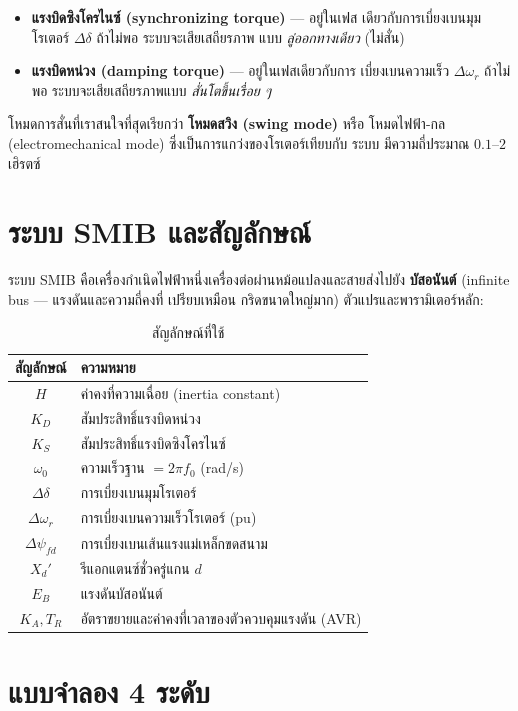 \documentclass[12pt,a4paper]{article}
\newcommand{\dwr}{\Delta\omega_r}
\newcommand{\ddel}{\Delta\delta}
\newcommand{\dpsifd}{\Delta\psi_{fd}}
\begin{document}
\begin{itemize}
  \item \textbf{แรงบิดซิงโครไนซ์ (synchronizing torque)} --- อยู่ในเฟส
        เดียวกับการเบี่ยงเบนมุมโรเตอร์ $\ddel$ ถ้าไม่พอ ระบบจะเสียเสถียรภาพ
        แบบ \emph{ลู่ออกทางเดียว} (ไม่สั่น)
  \item \textbf{แรงบิดหน่วง (damping torque)} --- อยู่ในเฟสเดียวกับการ
        เบี่ยงเบนความเร็ว $\dwr$ ถ้าไม่พอ ระบบจะเสียเสถียรภาพแบบ
        \emph{สั่นโตขึ้นเรื่อย ๆ}
\end{itemize}

โหมดการสั่นที่เราสนใจที่สุดเรียกว่า \textbf{โหมดสวิง (swing mode)} หรือ
โหมดไฟฟ้า-กล (electromechanical mode) ซึ่งเป็นการแกว่งของโรเตอร์เทียบกับ
ระบบ มีความถี่ประมาณ $0.1$--$2$ เฮิรตซ์

\section{ระบบ SMIB และสัญลักษณ์}

ระบบ SMIB คือเครื่องกำเนิดไฟฟ้าหนึ่งเครื่องต่อผ่านหม้อแปลงและสายส่งไปยัง
\textbf{บัสอนันต์} (infinite bus --- แรงดันและความถี่คงที่ เปรียบเหมือน
กริดขนาดใหญ่มาก) ตัวแปรและพารามิเตอร์หลัก:

\begin{table}[H]
\centering
\caption{สัญลักษณ์ที่ใช้}
\begin{tabular}{@{}cl@{}}
\toprule
สัญลักษณ์ & ความหมาย \\
\midrule
$H$        & ค่าคงที่ความเฉื่อย (inertia constant) \\
$K_D$      & สัมประสิทธิ์แรงบิดหน่วง \\
$K_S$      & สัมประสิทธิ์แรงบิดซิงโครไนซ์ \\
$\omega_0$ & ความเร็วฐาน $= 2\pi f_0$ (rad/s) \\
$\ddel$    & การเบี่ยงเบนมุมโรเตอร์ \\
$\dwr$     & การเบี่ยงเบนความเร็วโรเตอร์ (pu) \\
$\dpsifd$  & การเบี่ยงเบนเส้นแรงแม่เหล็กขดสนาม \\
$X_d'$     & รีแอกแตนซ์ชั่วครู่แกน $d$ \\
$E_B$      & แรงดันบัสอนันต์ \\
$K_A, T_R$ & อัตราขยายและค่าคงที่เวลาของตัวควบคุมแรงดัน (AVR) \\
\bottomrule
\end{tabular}
\end{table}

\section{แบบจำลอง 4 ระดับ}
\end{document}
